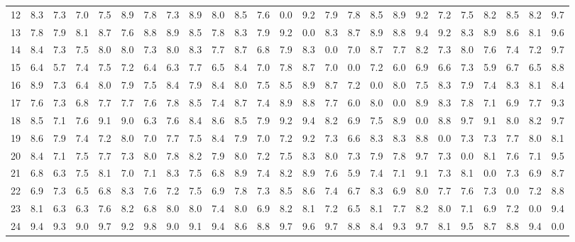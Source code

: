 \begin{table}[htbp]
\begin{tabular}{c|cccccccccccccccccccccccc}
12 & 8.3 & 7.3 & 7.0 & 7.5 & 8.9 & 7.8 & 7.3 & 8.9 & 8.0 & 8.5 & 7.6 & 0.0 & 9.2 & 7.9 & 7.8 & 8.5 & 8.9 & 9.2 & 7.2 & 7.5 & 8.2 & 8.5 & 8.2 & 9.7 \\
13 & 7.8 & 7.9 & 8.1 & 8.7 & 7.6 & 8.8 & 8.9 & 8.5 & 7.8 & 8.3 & 7.9 & 9.2 & 0.0 & 8.3 & 8.7 & 8.9 & 8.8 & 9.4 & 9.2 & 8.3 & 8.9 & 8.6 & 8.1 & 9.6 \\
14 & 8.4 & 7.3 & 7.5 & 8.0 & 8.0 & 7.3 & 8.0 & 8.3 & 7.7 & 8.7 & 6.8 & 7.9 & 8.3 & 0.0 & 7.0 & 8.7 & 7.7 & 8.2 & 7.3 & 8.0 & 7.6 & 7.4 & 7.2 & 9.7 \\
15 & 6.4 & 5.7 & 7.4 & 7.5 & 7.2 & 6.4 & 6.3 & 7.7 & 6.5 & 8.4 & 7.0 & 7.8 & 8.7 & 7.0 & 0.0 & 7.2 & 6.0 & 6.9 & 6.6 & 7.3 & 5.9 & 6.7 & 6.5 & 8.8 \\
16 & 8.9 & 7.3 & 6.4 & 8.0 & 7.9 & 7.5 & 8.4 & 7.9 & 8.4 & 8.0 & 7.5 & 8.5 & 8.9 & 8.7 & 7.2 & 0.0 & 8.0 & 7.5 & 8.3 & 7.9 & 7.4 & 8.3 & 8.1 & 8.4 \\
17 & 7.6 & 7.3 & 6.8 & 7.7 & 7.7 & 7.6 & 7.8 & 8.5 & 7.4 & 8.7 & 7.4 & 8.9 & 8.8 & 7.7 & 6.0 & 8.0 & 0.0 & 8.9 & 8.3 & 7.8 & 7.1 & 6.9 & 7.7 & 9.3 \\
18 & 8.5 & 7.1 & 7.6 & 9.1 & 9.0 & 6.3 & 7.6 & 8.4 & 8.6 & 8.5 & 7.9 & 9.2 & 9.4 & 8.2 & 6.9 & 7.5 & 8.9 & 0.0 & 8.8 & 9.7 & 9.1 & 8.0 & 8.2 & 9.7 \\
19 & 8.6 & 7.9 & 7.4 & 7.2 & 8.0 & 7.0 & 7.7 & 7.5 & 8.4 & 7.9 & 7.0 & 7.2 & 9.2 & 7.3 & 6.6 & 8.3 & 8.3 & 8.8 & 0.0 & 7.3 & 7.3 & 7.7 & 8.0 & 8.1 \\
20 & 8.4 & 7.1 & 7.5 & 7.7 & 7.3 & 8.0 & 7.8 & 8.2 & 7.9 & 8.0 & 7.2 & 7.5 & 8.3 & 8.0 & 7.3 & 7.9 & 7.8 & 9.7 & 7.3 & 0.0 & 8.1 & 7.6 & 7.1 & 9.5 \\
21 & 6.8 & 6.3 & 7.5 & 8.1 & 7.0 & 7.1 & 8.3 & 7.5 & 6.8 & 8.9 & 7.4 & 8.2 & 8.9 & 7.6 & 5.9 & 7.4 & 7.1 & 9.1 & 7.3 & 8.1 & 0.0 & 7.3 & 6.9 & 8.7 \\
22 & 6.9 & 7.3 & 6.5 & 6.8 & 8.3 & 7.6 & 7.2 & 7.5 & 6.9 & 7.8 & 7.3 & 8.5 & 8.6 & 7.4 & 6.7 & 8.3 & 6.9 & 8.0 & 7.7 & 7.6 & 7.3 & 0.0 & 7.2 & 8.8 \\
23 & 8.1 & 6.3 & 6.3 & 7.6 & 8.2 & 6.8 & 8.0 & 8.0 & 7.4 & 8.0 & 6.9 & 8.2 & 8.1 & 7.2 & 6.5 & 8.1 & 7.7 & 8.2 & 8.0 & 7.1 & 6.9 & 7.2 & 0.0 & 9.4 \\
24 & 9.4 & 9.3 & 9.0 & 9.7 & 9.2 & 9.8 & 9.0 & 9.1 & 9.4 & 8.6 & 8.8 & 9.7 & 9.6 & 9.7 & 8.8 & 8.4 & 9.3 & 9.7 & 8.1 & 9.5 & 8.7 & 8.8 & 9.4 & 0.0 \\
\hline
\end{tabular}
\end{table}




